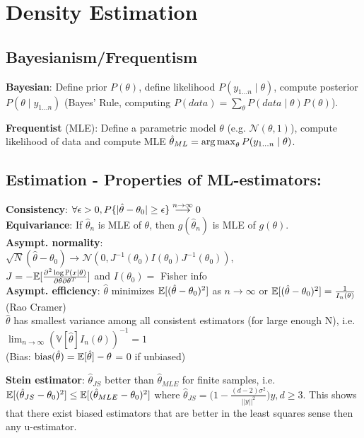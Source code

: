 \section{Density Estimation}

\subsection*{Bayesianism/Frequentism}

\textbf{Bayesian}: Define prior $P(\theta)$,
define likelihood $P(y_{1 \ldots n} \mid \theta)$,
compute posterior $P(\theta \mid y_{1 \ldots n})$
(Bayes' Rule, computing $P(data) = \sum_{\theta} P(data \mid \theta) P(\theta)$).

\textbf{Frequentist} (MLE):
Define a parametric model $\theta$ (e.g. $\mathcal{N}(\theta, 1)$),
compute likelihood of data
and compute MLE $\hat{\theta}_{ML} = \operatorname*{arg\,max}_{\theta} P(y_{1 \ldots n} \mid \theta)$.


\subsection*{Estimation - Properties of ML-estimators:}
\textbf{Consistency}: $\forall\epsilon>0, P \{|\hat{\theta}-\theta_0| \geq\epsilon\} \stackrel{\tiny n \to\infty}{\longrightarrow} 0 $\\
\textbf{Equivariance}: If $\hat \theta_n$ is MLE of $\theta$, then $g(\hat \theta_n)$ is MLE of $g(\theta)$.\\
\textbf{Asympt. normality}:\\
$\sqrt{N}(\hat{\theta} - \theta_0) \to \mathcal{N}(0, J^{-1}(\theta_0)I(\theta_0)J^{-1}(\theta_0))$,\\ 
$J= -\mathbb E[\frac{\partial^2 \log \mathbb{P}(x|\theta) }{\partial \theta \partial \theta ^{T}}]$ and $I(\theta_0)=$ Fisher info \\
\textbf{Asympt. efficiency}: $\hat{\theta}$ minimizes $\mathbb E[(\hat{\theta}-\theta_0)^2]$ as $n \to\infty$ or $\mathbb E[(\hat{\theta}-\theta_0)^2] = \frac{1}{I_n(\theta)}$ (Rao Cramer)\\
$\hat{\theta}$ has smallest variance among all consistent estimators (for large enough N), i.e. $\lim_{n\to\infty} (\mathbb{V}[\hat{\theta}]I_n(\theta))^{-1} = 1$\\
(Bias: $\text{bias}(\hat{\theta}) = \mathbb E[\hat{\theta}]-\theta$ = 0 if unbiased)

\textbf{Stein estimator}: $\hat{\theta}_{JS}$ better than $\hat{\theta}_{MLE}$ for finite samples, i.e. $\mathbb E[(\hat{\theta}_{JS}-\theta_0)^2]\leq \mathbb E[(\hat{\theta}_{MLE}-\theta_0)^2]$ where $\hat{\theta}_{JS}=\big(1-\frac{(d-2)\sigma^2}{||y||^2}\big)y, d\geq 3$. This shows that there exist biased estimators that are better in the least squares sense then any u-estimator.\\

